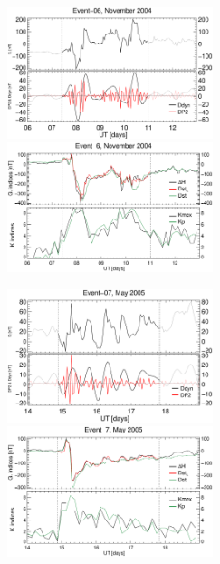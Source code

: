 \documentclass[a4paper,fleqn]{cas-dc}
\begin{document}
\begin{figure}[h!]
    \centering
    \centerline{\Large \bf   
         \hfill}
          \centerline{\Large \bf   
      \hspace{0.26\textwidth}  \color{black}{}
       \hspace{0.31\textwidth}  \color{black}{}
         \hfill}
    \includegraphics[width=6.0cm]{images/diono/iono_PI_V1_2004-11-06.eps}
	\includegraphics[width=6.0cm]{images/dH_approx/diono_valid_V4_2004-11-06.eps}    
     \centerline{\Large \bf   
      \hspace{0.275\textwidth}  \color{black}{}
       \hspace{0.295\textwidth}  \color{black}{}
         \hfill}
    \includegraphics[width=6.0cm]{images/diono/iono_PI_V1_2005-05-14.eps}   
	\includegraphics[width=6.0cm]{images/dH_approx/diono_valid_V4_2005-05-14.eps}        

\end{figure}
\end{document}
